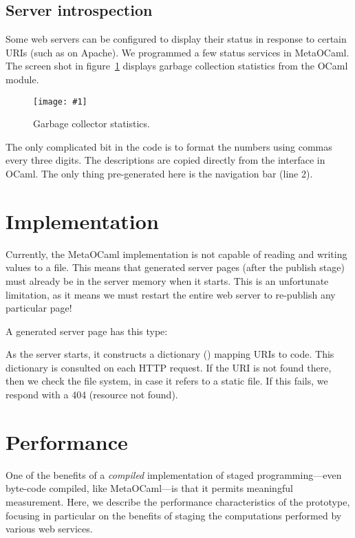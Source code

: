 \documentclass[preprint]{acm_proc_article-sp}
\def\MOC{MetaOCaml}
\newcommand{\myfig}[3]{%
  \begin{figure}[tbp]%
    #3%
    \caption{#2}%
    \label{fig:#1}%
  \end{figure}}
\newcommand{\screenshot}[2]{%
  \myfig{#1}{#2}
  {\centering%
    \texttt{[image: \#1]}}}
\begin{document}
\subsection{Server introspection}

Some web servers can be configured to display their status in
response to certain URIs (such as  on
Apache).  We programmed a few status services in \MOC.  The
screen shot in figure~\ref{fig:gc} displays garbage collection
statistics from the OCaml  module.

\screenshot{gc}{Garbage collector statistics.}

The only complicated bit in the code is to format the numbers
using commas every three digits.  The descriptions are copied
directly from the  interface in OCaml.  The only
thing pre-generated here is the navigation bar (line 2).


\section{Implementation}
\label{sec:impl}


Currently, the \MOC{} implementation is not capable of reading
and writing  values to a file.  This means that
generated server pages (after the publish stage) must already be
in the server memory when it starts.  This is an unfortunate
limitation, as it means we must restart the entire web server to
re-publish any particular page!

A generated server page has this type:


As the server starts, it constructs a dictionary () mapping URIs to code.  This dictionary is
consulted on each HTTP request.  If the URI is not found there,
then we check the file system, in case it refers to a static
file.  If this fails, we respond with a 404 (resource not
found).


\section{Performance}
\label{sec:perf}

One of the benefits of a \emph{compiled} implementation of staged
programming---even byte-code compiled, like \MOC{}---is that it
permits meaningful measurement.  Here, we describe the performance
characteristics of the prototype, focusing in particular on the
benefits of staging the computations performed by various web
services.
\end{document}
